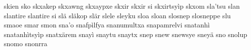 skien\hspace{2mm}
sko\hspace{2mm}
skxakep\hspace{2mm}
skxawng\hspace{2mm}
skxaypxe\hspace{2mm}
skxir\hspace{2mm}
skxir si\hspace{2mm}
skxirtsyìp\hspace{2mm}
skxom\hspace{2mm}
sla'tsu\hspace{2mm}
slan\hspace{2mm}
slantire\hspace{2mm}
slantire si\hspace{2mm}
slä\hspace{2mm}
släkop\hspace{2mm}
slär\hspace{2mm}
slele\hspace{2mm}
sleyku\hspace{2mm}
sloa\hspace{2mm}
sloan\hspace{2mm}
slosnep\hspace{2mm}
slosneppe\hspace{2mm}
slu\hspace{2mm}
smaoe\hspace{2mm}
smar\hspace{2mm}
smon\hspace{2mm}
sna'o\hspace{2mm}
snafpìlfya\hspace{2mm}
snanumultxa\hspace{2mm}
snapamrelvi\hspace{2mm}
snatanhì\hspace{2mm}
snatanhìtsyìp\hspace{2mm}
snatxärem\hspace{2mm}
snayì\hspace{2mm}
snaytu\hspace{2mm}
snaytx\hspace{2mm}
snep\hspace{2mm}
snew\hspace{2mm}
snewsye\hspace{2mm}
sneyä\hspace{2mm}
sno\hspace{2mm}
snolup\hspace{2mm}
snomo\hspace{2mm}
snonrra\hspace{2mm}
